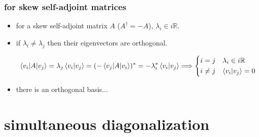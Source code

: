\subsubsection{for skew self-adjoint matrices}
\begin{itemize}
	\item for a skew self-adjoint matrix $A$ ($A^\dag = - A$), $\lambda_i \in i \mathbb{R}$.
	
	\item if $\lambda_i \neq \lambda_j$ then their eigenvectors are orthogonal.
	
	\begin{tcolorbox}[title=proof:]
		\begin{equation}
			\braket{v_i | A | v_j} = \lambda_j \braket{v_i | v_j} = (- \braket{v_j | A | v_i})^* = - \lambda_i^* \braket{v_i | v_j} \Longrightarrow \begin{dcases}
				i = j & \lambda_i \in i \mathbb{R} \\
				i \neq j & \braket{v_i | v_j} = 0
			\end{dcases}
		\end{equation}
	\end{tcolorbox}
	
	\item there is an orthogonal basis...
\end{itemize}

\section{simultaneous diagonalization} \label{A.3}
